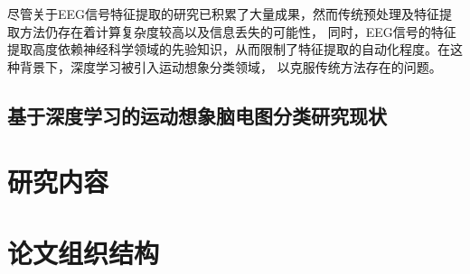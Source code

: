 尽管关于EEG信号特征提取的研究已积累了大量成果，然而传统预处理及特征提取方法仍存在着计算复杂度较高以及信息丢失的可能性，
同时，EEG信号的特征提取高度依赖神经科学领域的先验知识，从而限制了特征提取的自动化程度\cite{altaheri2023deep}。在这种背景下，深度学习被引入运动想象分类领域，
以克服传统方法存在的问题。

\subsection{基于深度学习的运动想象脑电图分类研究现状}

\section{研究内容}

\section{论文组织结构}